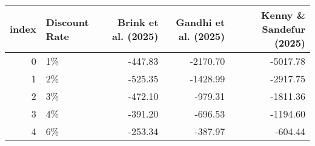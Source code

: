 \begin{tabular}{rlrrr}
\toprule
index & Discount Rate & Brink et al. (2025) & Gandhi et al. (2025) & Kenny \& Sandefur (2025) \\
\midrule
0 & 1\% & -447.83 & -2170.70 & -5017.78 \\
1 & 2\% & -525.35 & -1428.99 & -2917.75 \\
2 & 3\% & -472.10 & -979.31 & -1811.36 \\
3 & 4\% & -391.20 & -696.53 & -1194.60 \\
4 & 6\% & -253.34 & -387.97 & -604.44 \\
\bottomrule
\end{tabular}
